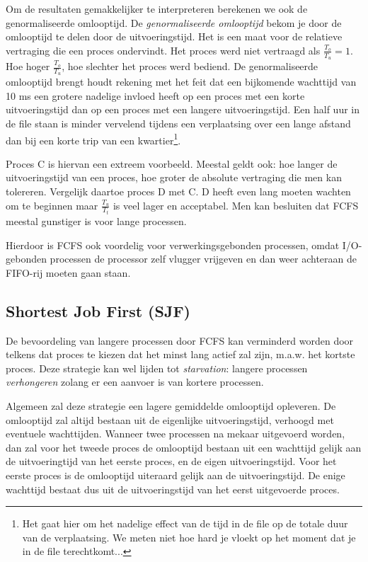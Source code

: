 Om de resultaten gemakkelijker te interpreteren berekenen we ook de
genormaliseerde omlooptijd. De \emph{genormaliseerde omlooptijd} bekom
je door de omlooptijd te delen door de uitvoeringstijd. Het is een maat
voor de relatieve vertraging die een proces ondervindt. Het proces
werd niet vertraagd als $\frac{T_o}{T_u} = 1$. Hoe hoger $\frac{T_o}{T_u}$, hoe
slechter het proces werd bediend. De genormaliseerde omlooptijd brengt houdt
rekening met het feit dat een bijkomende wachttijd van 10 ms een grotere
nadelige
invloed heeft op een proces met een korte uitvoeringstijd dan op een proces met
een langere uitvoeringstijd. Een half uur in de file staan is minder vervelend
tijdens een verplaatsing over een lange afstand dan bij een korte trip van een
kwartier\footnote{Het gaat hier om het nadelige effect van de tijd in de file
op de totale duur van de verplaatsing. We meten niet hoe hard je vloekt op het
moment dat je in de file terechtkomt...}.

Proces C is hiervan een extreem voorbeeld. Meestal geldt ook: hoe
langer de uitvoeringstijd van een proces, hoe groter de absolute
vertraging die men kan tolereren. Vergelijk daartoe proces D met C. D
heeft even lang moeten wachten om te beginnen maar
$\frac{T_u}{T_t}$ is veel lager en acceptabel. Men kan besluiten dat FCFS
meestal gunstiger is voor lange processen.

Hierdoor is FCFS ook voordelig voor verwerkingsgebonden
processen, omdat I/O-gebonden processen de processor zelf vlugger
vrijgeven en dan weer achteraan de FIFO-rij moeten gaan staan.

\subsection{Shortest Job First (SJF)}

De bevoordeling van langere processen door FCFS kan verminderd
worden door telkens dat proces te kiezen dat het minst lang actief zal
zijn, m.a.w. het kortste proces. Deze strategie kan wel lijden tot
\emph{starvation}: langere processen
\emph{verhongeren} zolang er een aanvoer is van
kortere processen.

Algemeen zal deze strategie een lagere gemiddelde omlooptijd
opleveren. De omlooptijd zal altijd bestaan uit de eigenlijke
uitvoeringstijd, verhoogd met eventuele wachttijden. Wanneer twee
processen na mekaar uitgevoerd worden, dan zal voor het tweede proces
de omlooptijd bestaan uit een wachttijd gelijk aan de uitvoeringtijd
van het eerste proces, en de eigen uitvoeringstijd. Voor het eerste
proces is de omlooptijd uiteraard gelijk aan de uitvoeringstijd. De
enige wachttijd bestaat dus uit de uitvoeringstijd van het eerst
uitgevoerde proces.


